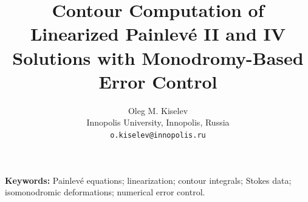 \documentclass[a4paper,11pt]{article}
\title{Contour Computation of Linearized Painlev\'e II and IV Solutions
with Monodromy-Based Error Control}
\author{Oleg M. Kiselev\\[3pt]
\small Innopolis University, Innopolis, Russia\\
\small\texttt{o.kiselev@innopolis.ru}}
\date{}
\begin{document}
\maketitle
\begin{abstract}

\end{abstract}
\noindent\textbf{Keywords:} Painlev\'e equations; linearization;
contour integrals; Stokes data; isomonodromic deformations;
numerical error control.



\end{document}
